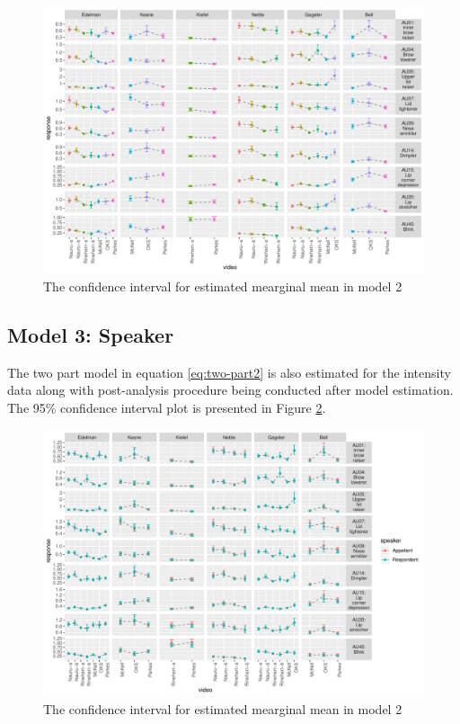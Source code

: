 \documentclass{monashthesis}
\begin{document}
\begin{figure}

{\centering \includegraphics[width=1\linewidth]{figures/intensity-video-1} 

}

\caption{The confidence interval for estimated mearginal mean in model 2}\label{fig:intensity-video}
\end{figure}

\newpage

\hypertarget{model-3-speaker-2}{%
\subsection{Model 3: Speaker}\label{model-3-speaker-2}}

The two part model in equation \ref{eq:two-part2} is also estimated for the intensity data along with post-analysis procedure being conducted after model estimation. The 95\% confidence interval plot is presented in Figure \ref{fig:intensity-speaker}.

\begin{figure}

{\centering \includegraphics[width=1\linewidth]{figures/intensity-speaker-1} 

}

\caption{The confidence interval for estimated mearginal mean in model 2}\label{fig:intensity-speaker}
\end{figure}
\end{document}
